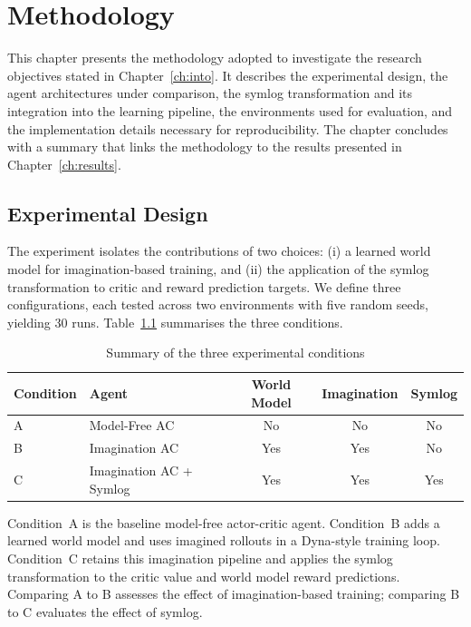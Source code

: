 
\chapter{Methodology}
\label{ch:method}

This chapter presents the methodology adopted to investigate the research objectives
stated in Chapter~\ref{ch:into}. It describes the experimental design, the agent
architectures under comparison, the symlog transformation and its integration into
the learning pipeline, the environments used for evaluation, and the implementation
details necessary for reproducibility. The chapter concludes with a summary that
links the methodology to the results presented in Chapter~\ref{ch:results}.

\section{Experimental Design}
\label{sec:method_design}

The experiment isolates the contributions of two choices: (i) a learned world model for imagination-based training, and (ii) the application of the symlog transformation to critic and reward prediction targets. We define three configurations, each tested across two environments with five random seeds, yielding 30 runs. Table~\ref{tab:conditions} summarises the three conditions.

\begin{table}[!ht]
    \centering
    \caption{Summary of the three experimental conditions}
    \label{tab:conditions}
    \begin{tabular}{llccc}
        \toprule
        \textbf{Condition} & \textbf{Agent} & \textbf{World Model} & \textbf{Imagination} & \textbf{Symlog} \\
        \midrule
        A & Model-Free AC        & No  & No  & No  \\
        B & Imagination AC       & Yes & Yes & No  \\
        C & Imagination AC + Symlog & Yes & Yes & Yes \\
        \bottomrule
    \end{tabular}
\end{table}

Condition~A is the baseline model-free actor-critic agent. Condition~B adds a learned world model and uses imagined rollouts in a Dyna-style training loop. Condition~C retains this imagination pipeline and applies the symlog transformation to the critic value and world model reward predictions. Comparing A to B assesses the effect of imagination-based training; comparing B to C evaluates the effect of symlog.

